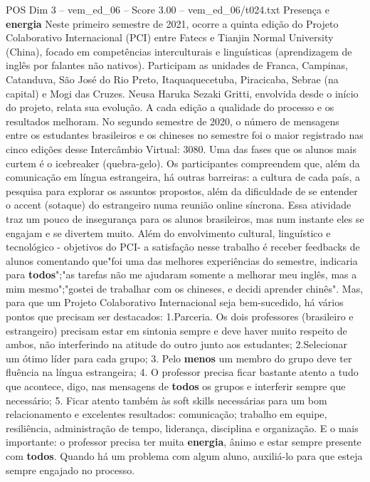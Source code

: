 \begin{textsample}{POS Dim 3 – vem\_ed\_06 – Score 3.00 – vem\_ed\_06/t024.txt}  \label{ex:f3_pos_002}
Presença e \textbf{energia} Neste primeiro semestre de 2021, ocorre a quinta edição do Projeto Colaborativo Internacional (PCI) entre Fatecs e Tianjin Normal University (China), focado em competências interculturais e linguísticas (aprendizagem de inglês por falantes não nativos).
Participam as unidades de Franca, Campinas, Catanduva, São José do Rio Preto, Itaquaquecetuba, Piracicaba, Sebrae (na capital) e Mogi das Cruzes.
Neusa Haruka Sezaki Gritti, envolvida desde o início do projeto, relata sua evolução.
A cada edição a qualidade do processo e os resultados melhoram.
No segundo semestre de 2020, o número de mensagens entre os estudantes brasileiros e os chineses no semestre foi o maior registrado nas cinco edições desse Intercâmbio Virtual: 3080.
Uma das fases que os alunos mais curtem é o icebreaker (quebra-gelo).
Os participantes compreendem que, além da comunicação em língua estrangeira, há outras barreiras: a cultura de cada país, a pesquisa para explorar os assuntos propostos, além da dificuldade de se entender o accent (sotaque) do estrangeiro numa reunião online síncrona.
Essa atividade traz um pouco de insegurança para os alunos brasileiros, mas num instante eles se engajam e se divertem muito.
Além do envolvimento cultural, linguístico e tecnológico - objetivos do PCI- a satisfação nesse trabalho é receber feedbacks de alunos comentando que"foi uma das melhores experiências do semestre, indicaria para \textbf{todos}";"as tarefas não me ajudaram somente a melhorar meu inglês, mas a mim mesmo";"gostei de trabalhar com os chineses, e decidi aprender chinês".
Mas, para que um Projeto Colaborativo Internacional seja bem-sucedido, há vários pontos que precisam ser destacados: 1.Parceria.
Os dois professores (brasileiro e estrangeiro) precisam estar em sintonia sempre e deve haver muito respeito de ambos, não interferindo na atitude do outro junto aos estudantes; 2.Selecionar um ótimo líder para cada grupo; 3.
Pelo \textbf{menos} um membro do grupo deve ter fluência na língua estrangeira; 4.
O professor precisa ficar bastante atento a tudo que acontece, digo, nas mensagens de \textbf{todos} os grupos e interferir sempre que necessário; 5.
Ficar atento também às soft skills necessárias para um bom relacionamento e excelentes resultados: comunicação; trabalho em equipe, resiliência, administração de tempo, liderança, disciplina e organização.
E o mais importante: o professor precisa ter muita \textbf{energia}, ânimo e estar sempre presente com \textbf{todos}.
Quando há um problema com algum aluno, auxiliá-lo para que esteja sempre engajado no processo.

\end{textsample}
